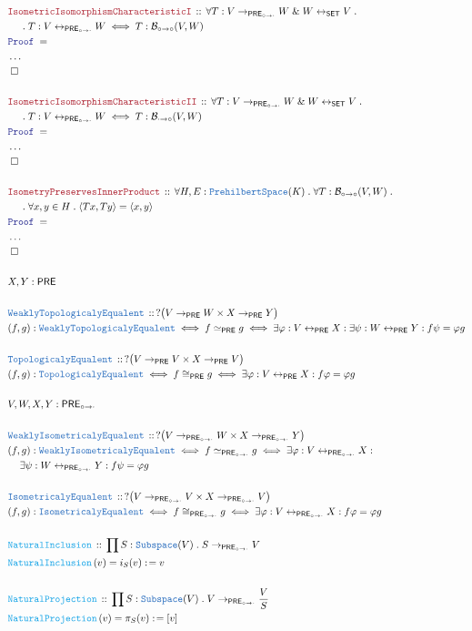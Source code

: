 \documentclass[12pt]{scrartcl}
\newcommand{\TYPE}[1]{\textcolor{NavyBlue}{\mathtt{#1}}}
\newcommand{\FUNC}[1]{\textcolor{Cerulean}{\mathtt{#1}}}
\newcommand{\LOGIC}[1]{\textcolor{Blue}{\mathtt{#1}}}
\newcommand{\THM}[1]{\textcolor{Maroon}{\mathtt{#1}}}
\renewcommand{\.}{\; . \;}
\newcommand{\de}{: \kern 0.1pc =}
\newcommand{\Act}[1]{\left( #1 \right)}
\newcommand{\Theorem}[2]{& \THM{#1} \, :: \, #2 \\ & \Proof = \\ }
\newcommand{\DeclareType}[2]{& \TYPE{#1} \, :: \, #2 \\}
\newcommand{\DefineNamedType}[4]{& #1 : \TYPE{#2} \iff #3 \iff #4 \\}
\newcommand{\DeclareFunc}[2]{& \FUNC{#1} \, :: \, #2 \\}
\newcommand{\DefineNamedFunc}[4]{&  \FUNC{#1}\Act{#2} = #3 \de #4 \\}
\newcommand{\NewLine}{\\ & \kern 1pc}
\newcommand{\Page}[1]{\begin{align*} #1 \end{align*} \newpage   }
\newcommand{\NoProof}{ & \ldots \\ \EndProof}
\renewcommand{\And}{\; \& \;}
\newcommand{\ToBij}{\leftrightarrow}
\newcommand{\QED}{\; \square}
\newcommand{\EndProof}{& \QED \\}
\newcommand{\Proof}{\LOGIC{Proof} \; }
\newcommand{\PRE}{\mathsf{PRE}} %
\newcommand{\PREI}{\mathsf{PRE}_{\circ \to \cdot}} %
\newcommand{\B}{\mathcal{B}}
\begin{document}
 \Page{
       \Theorem{IsometricIsomorphismCharacteristicI}
       { \forall T : V \to_{\PREI} W \And W \leftrightarrow_{\mathsf{SET}} V \. 
         \NewLine  \. 
         T : V \leftrightarrow_{\PREI} W \iff 
         T : \B_{\circ \to \circ}(V,W)       
         }
        \NoProof   
        \\
       \Theorem{IsometricIsomorphismCharacteristicII}
       { \forall T : V \to_{\PREI} W \And W \leftrightarrow_{\mathsf{SET}} V \. 
         \NewLine  \. 
         T : V \leftrightarrow_{\PREI} W \iff 
         T : \B_{\cdot \to \circ}(V,W)       
         }
        \NoProof  
        \\
       \Theorem{IsometryPreservesInnerProduct}
       {
       \forall H,E : \TYPE{PrehilbertSpace}(K) \. 
       \forall T : \B_{\circ \to \circ}(V,W) \. 
        \NewLine \.
       \forall x,y \in H \.
       \langle Tx, Ty \rangle = \langle x, y \rangle 
       }   
       \NoProof
       \\
       & X,Y : \PRE \\
       \\
       \DeclareType{WeaklyTopologicalyEqualent}
       { ? \big(  V \to_\PRE W \times  X \to_\PRE Y \big)   }
       \DefineNamedType{(f,g)}{WeaklyTopologicalyEqualent}
       {f \simeq_\PRE g}{ \exists \varphi : V \ToBij_\PRE X : \exists \psi : 
         W \ToBij_\PRE Y : f \psi = \varphi g   }
      \\
      \DeclareType{TopologicalyEqualent}
       { ? \big(  V \to_\PRE V \times  X \to_\PRE V \big)   }
       \DefineNamedType{(f,g)}{TopologicalyEqualent}
       {f \cong_\PRE g}{ \exists \varphi : V \ToBij_\PRE X : f \varphi = \varphi g   }
       \\
         & V,W,X,Y : \PREI \\
         \\
         \DeclareType{WeaklyIsometricalyEqualent}
       { ? \big(  V \to_{\PREI} W \times  X \to_{\PREI} Y \big)   }
       \DefineNamedType{(f,g)}{WeaklyIsometricalyEqualent}
       {f \simeq_{\PREI} g}{ \exists \varphi : V \ToBij_{\PREI} X : 
       \NewLine           
       \exists \psi : 
         W \ToBij_{\PREI} Y : f \psi = \varphi g   }
      \\
      \DeclareType{IsometricalyEqualent}
       { ? \big(  V \to_{\PREI} V \times  X \to_{\PREI} V \big)   }
       \DefineNamedType{(f,g)}{IsometricalyEqualent}
       {f \cong_{\PREI} g}{ \exists \varphi : V \ToBij_{\PREI} X : f \varphi = \varphi g }
       \\
      \DeclareFunc{NaturalInclusion}{ \prod S : \TYPE{Subspace}(V) 
         \.  S \to_{\PREI} V  }
      \DefineNamedFunc{NaturalInclusion}{v}{i_S(v)}{v}
      \\
      \DeclareFunc{NaturalProjection}{ \prod S : \TYPE{Subspace}(V) 
         \.  V \to_{\PREI} \frac{V}{S}  }
      \DefineNamedFunc{NaturalProjection}{v}{\pi_S(v)}{[v]}      
      }
\end{document}
